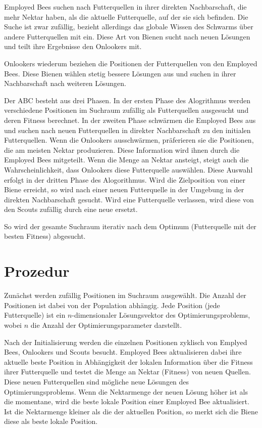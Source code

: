 Employed Bees suchen nach Futterquellen in ihrer direkten Nachbarschaft, die
mehr Nektar haben, als die aktuelle Futterquelle, auf der sie sich befinden.
Die Suche ist zwar zufällig, bezieht allerdings das globale Wissen des
Schwarms über andere Futterquellen mit ein. Diese Art von Bienen sucht nach
neuen Lösungen und teilt ihre Ergebnisse den Onlookers mit.

Onlookers wiederum beziehen die Positionen der Futterquellen von den
Employed Bees. Diese Bienen wählen stetig bessere Lösungen aus und suchen in
ihrer Nachbarschaft nach weiteren Lösungen.

Der ABC besteht aus drei Phasen. In der ersten Phase des Alogrithmus werden
verschiedene Positionen im Suchraum zufällig als Futterquellen ausgesucht und
deren Fitness berechnet.
In der zweiten Phase schwärmen die Employed Bees aus und suchen nach neuen
Futterquellen in direkter Nachbarschaft zu den initialen Futterquellen.
Wenn die Onlookers ausschwärmen, präferieren sie die Positionen, die
am meisten Nektar produzieren. Diese Information wird ihnen durch die
Employed Bees mitgeteilt. Wenn die Menge an Nektar ansteigt, steigt auch
die Wahrscheinlichkeit, dass Onlookers diese Futterquelle auswählen. Diese
Auswahl erfolgt in der dritten Phase des Alogorithmus.
Wird die Zielposition von einer Biene erreicht, so wird nach einer neuen
Futterquelle in der Umgebung in der direkten Nachbarschaft gesucht.
Wird eine Futterquelle verlassen, wird diese von den Scouts zufällig durch
eine neue ersetzt.

So wird der gesamte Suchraum iterativ nach dem Optimum (Futterquelle mit der
besten Fitness) abgesucht.

\section{Prozedur}

Zunächst werden zufällig Positionen im Suchraum ausgewählt. Die Anzahl der
Positionen ist dabei von der Population abhängig. Jede Position (jede
Futterquelle) ist ein $n$-dimensionaler Lösungsvektor des
Optimierungsproblems, wobei $n$ die Anzahl der Optimierungsparameter
darstellt.

Nach der Initialisierung werden die einzelnen Positionen zyklisch von
Emplyed Bees, Onlookers und Scouts besucht. Employed Bees aktualisieren
dabei ihre aktuelle beste Position in Abhängigkeit der lokalen Information
über die Fitness ihrer Futterquelle und testet die Menge an Nektar
(Fitness) von neuen Quellen. Diese neuen Futterquellen sind mögliche neue
Lösungen des Optimierungsproblems.
Wenn die Nektarmenge der neuen Lösung höher ist als die momentane, wird die
beste lokale Position einer Employed Bee aktualisiert. Ist die Nektarmenge
kleiner als die der aktuellen Position, so merkt sich die Biene diese als
beste lokale Position.


